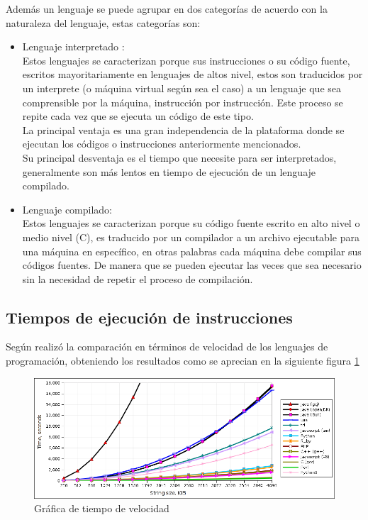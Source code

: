 Además un lenguaje se puede agrupar en dos categorías de acuerdo con la naturaleza del lenguaje, estas categorías son:
\begin{itemize}
	\item Lenguaje interpretado	:\\
	Estos lenguajes se caracterizan porque sus instrucciones o su código fuente, escritos mayoritariamente en lenguajes de altos nivel, estos son traducidos por un interprete (o máquina virtual según sea el caso) a un lenguaje que sea comprensible por la máquina, instrucción por instrucción. Este proceso se repite cada vez que se ejecuta un código de este tipo.\\
	La principal ventaja es una gran independencia de la plataforma donde se ejecutan los códigos o instrucciones anteriormente mencionados.\\
	Su principal desventaja es el tiempo que necesite para ser interpretados, generalmente son más lentos en tiempo de ejecución de un lenguaje compilado.  
	\item Lenguaje compilado:\\
	Estos lenguajes se caracterizan porque su código fuente escrito en alto nivel o medio nivel (C), es traducido por un compilador a un archivo ejecutable para una máquina en específico, en otras palabras cada máquina debe compilar sus códigos fuentes. De manera que se pueden ejecutar las veces que sea necesario sin la necesidad de repetir el proceso de compilación.
\end{itemize}

\subsection*{Tiempos de ejecución de instrucciones}

Según \cite{speed} realizó la comparación en términos de velocidad de los lenguajes de programación, obteniendo los resultados como se aprecian en la siguiente figura \ref{speed} 

\begin{figure}[hbtp]
	\centering
	\includegraphics[width=15cm]{fig/speed.png}
	\caption{\label{speed} Gráfica de tiempo de velocidad}
\end{figure} 	

